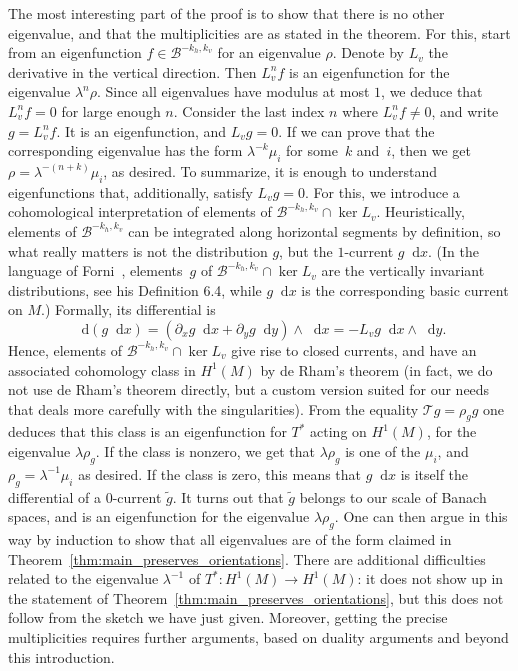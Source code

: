 \documentclass[10pt]{amsart}
\newcommand{\boB}{\mathcal{B}}
\newcommand{\boT}{\mathcal{T}}
\newcommand{\dd}{\mathop{}\!\mathrm{d}}
\theoremstyle{definition}
\numberwithin{equation}{section}
\begin{document}
The most interesting part of the proof is to show that there is no other
eigenvalue, and that the multiplicities are as stated in the theorem. For
this, start from an eigenfunction $f \in \boB^{-k_h, k_v}$ for an eigenvalue
$\rho$. Denote by $L_v$ the derivative in the vertical direction. Then $L_v^n
f$ is an eigenfunction for the eigenvalue $\lambda^n \rho$. Since all
eigenvalues have modulus at most $1$, we deduce that $L_v^n f = 0$ for large
enough $n$. Consider the last index $n$ where $L_v^n f \neq 0$, and write $g
= L_v^n f$. It is an eigenfunction, and $L_v g = 0$. If we can prove that the
corresponding eigenvalue has the form $\lambda^{-k} \mu_i$ for some~$k$ and~$i$, then we get $\rho = \lambda^{-(n+k)} \mu_i$, as desired. To summarize,
it is enough to understand eigenfunctions that, additionally, satisfy $L_v g
= 0$. For this, we introduce a cohomological interpretation of elements of
$\boB^{-k_h, k_v} \cap \ker L_v$. Heuristically, elements of $\boB^{-k_h,
k_v}$ can be integrated along horizontal segments by definition, so what
really matters is not the distribution $g$, but the $1$-current $g\dd x$. (In
the language of Forni~\cite{forni_deviation}, elements~$g$ of $\boB^{-k_h,
k_v} \cap \ker L_v$ are the vertically invariant distributions, see his
Definition 6.4, while $g\dd x$ is the corresponding basic current on $M$.)
Formally, its differential is
\begin{equation*}
\dd(g\dd x) =
(\partial_x g \dd x + \partial_y g \dd y) \wedge \dd x
= - L_v g \dd x \wedge \dd y.
\end{equation*}
Hence, elements of $\boB^{-k_h, k_v} \cap \ker L_v$ give rise to closed
currents, and have an associated cohomology class in $H^1(M)$ by de Rham's
theorem (in fact, we do not use de Rham's theorem directly, but a custom
version suited for our needs that deals more carefully with the
singularities). From the equality $\boT g = \rho_g g$ one deduces that this
class is an eigenfunction for $T^*$ acting on $H^1(M)$, for the eigenvalue
$\lambda \rho_g$. If the class is nonzero, we get that $\lambda \rho_g$ is
one of the $\mu_i$, and $\rho_g = \lambda^{-1} \mu_i$ as desired. If the
class is zero, this means that $g \dd x$ is itself the differential of a
$0$-current $\tilde g$. It turns out that $\tilde g$ belongs to our scale of
Banach spaces, and is an eigenfunction for the eigenvalue $\lambda \rho_g$.
One can then argue in this way by induction to show that all eigenvalues are
of the form claimed in Theorem~\ref{thm:main_preserves_orientations}. There
are additional difficulties related to the eigenvalue $\lambda^{-1}$ of $T^*
: H^1(M)\to H^1(M)$: it does not show up in the statement of
Theorem~\ref{thm:main_preserves_orientations}, but this does not follow from
the sketch we have just given. Moreover, getting the precise multiplicities
requires further arguments, based on duality arguments and beyond this
introduction.
\end{document}
